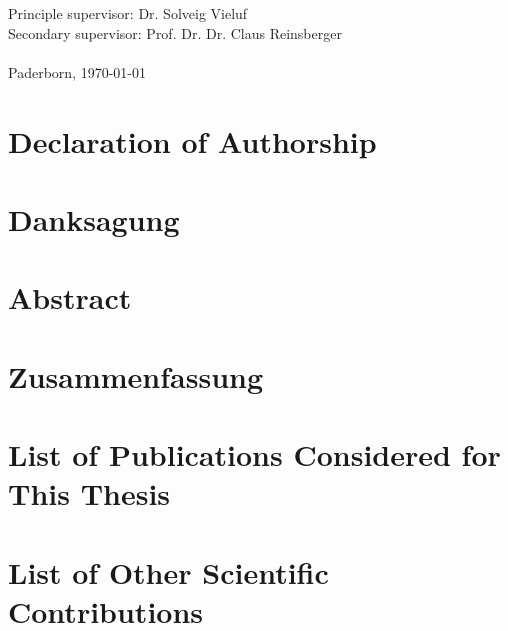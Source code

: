 \documentclass[oneside]{book}
\begin{document}
    
    
    \newpage
    \thispagestyle{empty} 
    \vspace*{\fill}
    \noindent Principle supervisor: Dr. Solveig Vieluf\\
    \noindent Secondary supervisor: Prof. Dr. Dr. Claus Reinsberger\\
    \\
    Paderborn, \today

    \chapter*{Declaration of Authorship}
    
    \thispagestyle{empty}

    \chapter*{Danksagung}
    
    \thispagestyle{empty}
    
    \chapter*{Abstract}
    \setcounter{page}{1}
    
    
    \chapter*{Zusammenfassung}
    

    \chapter*{List of Publications Considered for This Thesis}
    

    \chapter*{List of Other Scientific Contributions}
    
    
\end{document}
